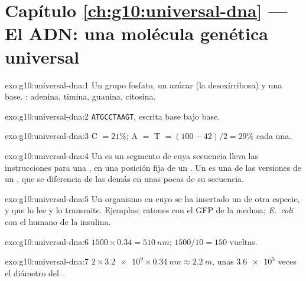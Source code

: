 \section*{Capítulo \ref{ch:g10:universal-dna} --- El ADN: una molécula genética universal}

\begin{solution}{exo:g10:universal-dna:1}
Un grupo fosfato, un azúcar (la desoxirribosa) y una base. :
adenina, timina, guanina, citosina.
\end{solution}

\begin{solution}{exo:g10:universal-dna:2}
\texttt{ATGCCTAAGT}, escrita base bajo base.
\end{solution}

\begin{solution}{exo:g10:universal-dna:3}
C $= 21\%$; A $=$ T $= (100 - 42)/2 = 29\%$ cada una.
\end{solution}

\begin{solution}{exo:g10:universal-dna:4}
Un  es un segmento de  cuya secuencia lleva las instrucciones
para una , en una posición fija de un . Un  es
una de las versiones de un , que se diferencia de las demás en unas
pocas  de su secuencia.
\end{solution}

\begin{solution}{exo:g10:universal-dna:5}
Un organismo en cuyo  se ha insertado un  de otra especie, y que
lo lee y lo transmite. Ejemplos: ratones con el  GFP de la medusa;
\emph{E.~coli} con el  humano de la insulina.
\end{solution}

\begin{solution}{exo:g10:universal-dna:6}
$1500 \times 0.34 = \qty{510}{nm}$; $1500/10 = 150$ vueltas.
\end{solution}

\begin{solution}{exo:g10:universal-dna:7}
$2 \times \num{3.2e9} \times \qty{0.34}{nm} \approx \qty{2.2}{m}$, unas
$\num{3.6e5}$ veces el diámetro del .
\end{solution}


